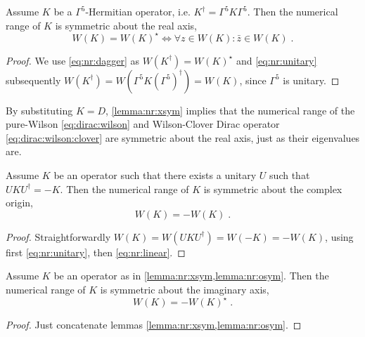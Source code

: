 \begin{lemma} \label{lemma:nr:xsym}
Assume $K$ be a $\Gamma^{5}$-Hermitian operator, i.e. $K^{\dagger} = \Gamma^{5} K \Gamma^{5}$.
Then the numerical range of $K$ is symmetric about the real axis,
\begin{equation}
W(K) = W(K)^{\star} \iff \forall z \in W(K) \colon \bar{z} \in W(K) \;.
\end{equation}
\end{lemma}

\begin{proof}
We use \cref{eq:nr:dagger} as $W(K^{\dagger}) = W(K)^{\star}$ and \cref{eq:nr:unitary} subsequently $W(K^{\dagger}) = W(\Gamma^{5} K (\Gamma^{5})^{\dagger}) = W(K)$, since $\Gamma^{5}$ is unitary.
\end{proof}

By substituting $K=D$, \cref{lemma:nr:xsym} implies that the numerical range of the pure-Wilson \cref{eq:dirac:wilson} and Wilson-Clover Dirac operator \cref{eq:dirac:wilson:clover} are symmetric about the real axis, just as their eigenvalues are.

\begin{lemma} \label{lemma:nr:osym}
Assume $K$ be an operator such that there exists a unitary $U$ such that $U K U^{\dagger} = -K$.
Then the numerical range of $K$ is symmetric about the complex origin,
\begin{equation}
W(K) = - W(K) \;.
\end{equation}
\end{lemma}

\begin{proof}
Straightforwardly $W(K) = W(U K U^{\dagger}) = W(-K) = -W(K)$, using first \cref{eq:nr:unitary}, then \cref{eq:nr:linear}.
\end{proof}

\begin{corollary} \label{lemma:nr:ysym}
Assume $K$ be an operator as in \cref{lemma:nr:xsym,lemma:nr:osym}.
Then the numerical range of $K$ is symmetric about the imaginary axis,
\begin{equation}
W(K) = - W(K)^{\star} \;.
\end{equation}
\end{corollary}

\begin{proof}
Just concatenate lemmas \cref{lemma:nr:xsym,lemma:nr:osym}.
\end{proof}

